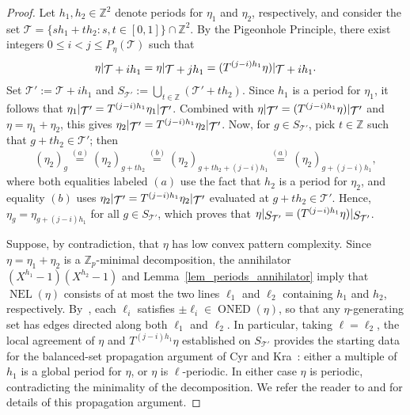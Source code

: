 \documentclass[12pt]{amsart}
\numberwithin{equation}{section}
\DeclareMathOperator{\nexpl}{NEL}
\DeclareMathOperator{\nexpd}{ONED}
\newcommand{\bb}[1]{\mathbb{#1}}
\newcommand{\sob}[1]{\ensuremath{{\mathbin |}\raise-.4ex\hbox{$#1$}}}
\begin{document}
\begin{proof}
Let $h_1, h_2 \in \bb{Z}^2$ denote periods for $\eta_1$ and $\eta_2$, respectively, and consider the set $\mathcal{T} = \{s h_1+t h_2 : s,t \in [0,1]\} \cap \bb{Z}^2$. By the Pigeonhole Principle, there exist integers $0 \leq i < j \leq P_{\eta}(\mathcal{T})$ such that 
$$\eta\sob{\mathcal{T}+i h_1} = \eta\sob{\mathcal{T}+j h_1} = (T^{(j-i)h_1}\eta)\sob{\mathcal{T}+i h_1}.$$ 
Set $\mathcal{T}' := \mathcal{T}+i h_1$ and $S_{\mathcal{T}'} := \bigcup_{t \in \bb{Z}} (\mathcal{T}'+t h_2)$. Since $h_1$ is a period for $\eta_1$, it follows that $\eta_1\sob{\mathcal{T}'} = T^{(j-i)h_1}\eta_1\sob{\mathcal{T}'}$. Combined with $\eta\sob{\mathcal{T}'} = (T^{(j-i)h_1}\eta)\sob{\mathcal{T}'}$ and $\eta = \eta_1+\eta_2$, this gives $\eta_2\sob{\mathcal{T}'} = T^{(j-i)h_1}\eta_2\sob{\mathcal{T}'}$. Now, for $g \in S_{\mathcal{T}'}$, pick $t \in \bb{Z}$ such that $g+t h_2 \in \mathcal{T}'$; then
$$(\eta_2)_g \stackrel{(a)}{=} (\eta_2)_{g+t h_2} \stackrel{(b)}{=} (\eta_2)_{g + t h_2+(j-i) h_1} \stackrel{(a)}{=} (\eta_2)_{ g +(j-i )h_1},$$ 
where both equalities labeled $(a)$ use the fact that $ h_2 $ is a period for $ \eta_2 $, and equality $ (b) $ uses $\eta_2\sob{\mathcal{T}'} = T^{(j-i)h_1}\eta_2\sob{\mathcal{T}'}$ evaluated at $ g + t h_2 \in \mathcal T' $. Hence, $\eta_g = \eta_{g +(j-i) h_1}$ for all $ g \in S_{\mathcal T'} $, which proves that $\eta\sob{S_{\mathcal{T}'}} = (T^{(j-i)h_1}\eta)\sob{S_{\mathcal{T}'}}$.

Suppose, by contradiction, that $\eta$ has low convex pattern complexity. 
Since $ \eta = \eta_1 + \eta_2 $ is a $\mathbb{Z}_p$-minimal decomposition, the annihilator $ (X^{h_1} - 1)(X^{h_2} - 1) $ and Lemma~\ref{lem_periods_annihilator} imply that $\nexpl(\eta)$ consists of at most the two lines $ \ell_1 $ and $ \ell_2 $ containing $ h_1 $ and $ h_2 $, respectively. By~\cite[Proposition~2.7]{Colle22}, each $ \ell_i $ satisfies $ \pm \pmb{\ell}_i \in \nexpd(\eta) $, so that any $\eta$-generating set has edges directed along both $ \ell_1 $ and $ \ell_2 $. In particular, taking $ \ell = \ell_2 $, the local agreement of $ \eta $ and $ T^{(j-i)h_1} \eta $ established on $ S_{\mathcal T'} $ provides the starting data for the balanced-set propagation argument of Cyr and Kra~\cite{CyrKra15}: either a multiple of $ h_1 $ is a global period for $ \eta $, or $ \eta $ is $\ell$-periodic. In either case $ \eta $ is periodic, contradicting the minimality of the decomposition. We refer the reader to \cite[Section~5]{CyrKra15} and \cite[Lemma~4]{Szabados18} for details of this propagation argument.
\end{proof}
\end{document}
